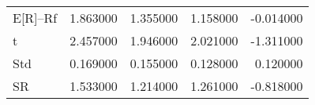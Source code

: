 \begin{tabular}{lrrrr}
\toprule
\midrule
E[R]--Rf & 1.863000 & 1.355000 & 1.158000 & -0.014000 \\
t & 2.457000 & 1.946000 & 2.021000 & -1.311000 \\
Std & 0.169000 & 0.155000 & 0.128000 & 0.120000 \\
SR & 1.533000 & 1.214000 & 1.261000 & -0.818000 \\
\bottomrule
\end{tabular}
